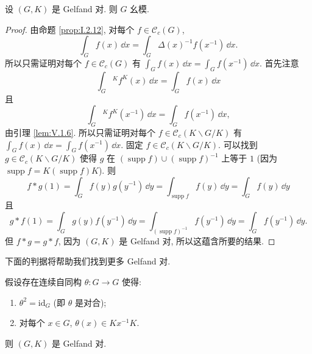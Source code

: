 \begin{proposition}
\label{prop:V.2.4}
设 $(G, K)$ 是 Gelfand 对. 则 $G$ 幺模.
\end{proposition}

\begin{proof}
由命题 \ref{prop:I.2.12}, 对每个 $f \in \mathcal{C}_c(G)$,
\[
\int_G f(x)\,\dd x = \int_G\Delta(x)^{-1}f(x^{-1})\,\dd x.
\]
所以只需证明对每个 $f \in \mathcal{C}_c(G)$ 有 $\int_G f(x)\,\dd x = \int_G f(x^{-1})\,\dd x$. 首先注意
\[
\int_G {}^Kf^K(x)\,\dd x = \int_G f(x)\,\dd x
\]
且
\[
\int_G {}^Kf^K(x^{-1})\,\dd x = \int_G f(x^{-1})\,\dd x,
\]
由引理 \ref{lem:V.1.6}. 所以只需证明对每个 $f \in \mathcal{C}_c(K\backslash G/K)$ 有 $\int_G f(x)\,\dd x = \int_G f(x^{-1})\,\dd x$. 固定 $f \in \mathcal{C}_c(K\backslash G/K)$. 可以找到 $g \in \mathcal{C}_c(K\backslash G/K)$ 使得 $g$ 在 $(\operatorname{supp}f) \cup (\operatorname{supp}f)^{-1}$ 上等于 $1$ (因为 $\operatorname{supp}f = K(\operatorname{supp}f)K$). 则
\[
f * g(1) = \int_G f(y)g(y^{-1})\,\dd y = \int_{\operatorname{supp}f}f(y)\,\dd y = \int_G f(y)\,\dd y
\]
且
\[
g * f(1) = \int_G g(y)f(y^{-1})\,\dd y = \int_{(\operatorname{supp}f)^{-1}}f(y^{-1})\,\dd y = \int_G f(y^{-1})\,\dd y.
\]
但 $f * g = g * f$, 因为 $(G, K)$ 是 Gelfand 对, 所以这蕴含所要的结果.
\end{proof}

下面的判据将帮助我们找到更多 Gelfand 对.

\begin{proposition}[对合判据]
\label{prop:V.2.5}
假设存在连续自同构 $\theta \colon G \to G$ 使得:
\begin{enumerate}
\item[(a)] $\theta^2 = \mathrm{id}_G$ (即 $\theta$ 是对合);
\item[(b)] 对每个 $x \in G$, $\theta(x) \in Kx^{-1}K$.
\end{enumerate}
则 $(G, K)$ 是 Gelfand 对.
\end{proposition}

